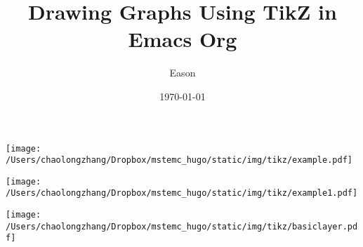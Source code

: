 \documentclass[koma,utopia,letterpaper,captions=tableheading,11pt,listings-sv,microtype,paralist,colorlinks=true,urlcolor=blue]{org-article}
\author{Eason}
\date{\today}
\title{Drawing Graphs Using TikZ in Emacs Org}
\begin{document}
\maketitle
\tableofcontents



\begin{center}
\texttt{[image: /Users/chaolongzhang/Dropbox/mstemc\_hugo/static/img/tikz/example.pdf]}
\end{center}

\begin{center}
\texttt{[image: /Users/chaolongzhang/Dropbox/mstemc\_hugo/static/img/tikz/example1.pdf]}
\end{center}

\begin{center}
\texttt{[image: /Users/chaolongzhang/Dropbox/mstemc\_hugo/static/img/tikz/basiclayer.pdf]}
\end{center}
\end{document}
